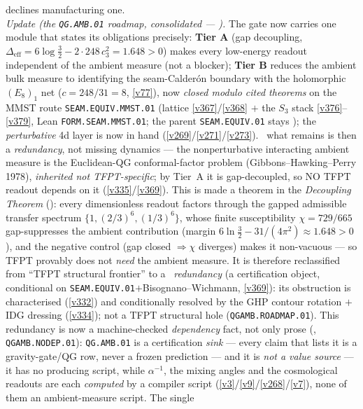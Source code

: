 \documentclass[11pt,a4paper]{article}
\newcommand{\cthree}{c_3}
\begin{document}
\begin{keybox}
declines manufacturing one.
\smallskip\\
\noindent\emph{Update (the \texttt{QG.AMB.01} roadmap, consolidated --- ).} The
gate now carries one module that states its obligations precisely: \textbf{Tier A} (gap decoupling,
$\Delta_{\mathrm{eff}}=6\log\tfrac32-2{\cdot}248\,\cthree^2=1.648>0$) makes every low-energy readout independent of
the ambient measure (not a blocker); \textbf{Tier B} reduces the ambient bulk measure to identifying the
seam-Calder\'on boundary with the holomorphic $(E_8)_1$ net ($c{=}248/31{=}8$, \vref{v77}), now \emph{closed modulo
cited theorems} on the MMST route \texttt{SEAM.EQUIV.MMST.01} (lattice \vref{v367}/\vref{v368} $+$ the $S_3$ stack
\vref{v376}--\vref{v379}, Lean
\texttt{FORM.SEAM.MMST.01}; the parent \texttt{SEAM.EQUIV.01} stays \mO);
the \emph{perturbative} 4d layer is now in hand (\vref{v269}/\vref{v271}/\vref{v273}). \mC\ what remains is then a
\emph{redundancy}, not missing dynamics --- the nonperturbative interacting ambient measure is the Euclidean-QG
conformal-factor problem (Gibbons--Hawking--Perry 1978), \emph{inherited not TFPT-specific}; by Tier~A it is
gap-decoupled, so NO TFPT readout depends on it (\vref{v335}/\vref{v369}).  This is made a theorem in the
\emph{Decoupling Theorem} (): every dimensionless readout factors through the
gapped admissible transfer spectrum $\{1,(2/3)^6,(1/3)^6\}$, whose finite susceptibility $\chi=729/665$
gap-suppresses the ambient contribution (margin $6\ln\tfrac32-31/(4\pi^2)\approx1.648>0$), and the negative control
(gap closed $\Rightarrow \chi$ diverges) makes it non-vacuous --- so TFPT provably does not \emph{need} the ambient
measure.  It is therefore reclassified from ``TFPT structural frontier'' to a \mC\ \emph{redundancy} (a certification
object, conditional on \texttt{SEAM.EQUIV.01}${+}$Bisognano--Wichmann, \vref{v369}): its obstruction is characterised
(\vref{v332}) and conditionally resolved by the GHP contour rotation $+$ IDG dressing (\vref{v334}); not a TFPT
structural hole (\texttt{QGAMB.ROADMAP.01}).
This redundancy is now a machine-checked \emph{dependency} fact, not only prose
(, \texttt{QGAMB.NODEP.01}): \texttt{QG.AMB.01} is a
certification \emph{sink} --- every claim that lists it is a gravity-gate/QG row, never a frozen
prediction --- and it is \emph{not a value source} --- it has no producing script, while $\alpha^{-1}$,
the mixing angles and the cosmological readouts are each \emph{computed} by a compiler script
(\vref{v3}/\vref{v9}/\vref{v268}/\vref{v7}), none of them an ambient-measure script. The single

\end{keybox}
\end{document}
